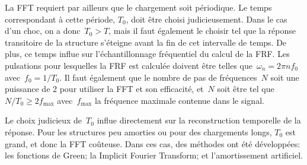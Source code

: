 La FFT requiert par ailleurs que le chargement soit périodique. Le temps correspondant à cette période, $T_0$, doit être choisi judicieusement. Dans le cas d'un choc, on a donc~$T_0 > T$, mais il faut également le choisir tel que la réponse transitoire de la structure s'éteigne avant la fin de cet intervalle de temps. De plus, ce temps influe sur l'échantillonnage fréquentiel du calcul de la FRF. Les pulsations pour lesquelles la FRF est calculée doivent être telles que~$\omega_n=2\pi n f_0$ avec~$f_0=1/T_0$. Il faut également que le nombre de pas de fréquences~$N$ soit une puissance de 2 pour utiliser la FFT et son efficacité, et~$N$ soit être tel que~$N/T_0 \ge 2 f_{\max}$ avec~$f_{\max}$ la fréquence maximale contenue dans le signal.

\medskip
Le choix judicieux de~$T_0$ influe directement sur la reconstruction temporelle de la réponse. Pour les structures peu amorties ou pour des chargements longs, $T_0$ est grand, et donc la FFT coûteuse. Dans ces cas, des méthodes ont été développées: les fonctions de Green; la Implicit Fourier Transform; et l'amortissement artificiel.

